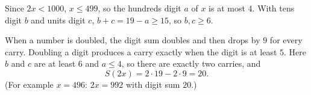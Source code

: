 Since $2x<1000$, $x\le499$, so the hundreds digit $a$ of $x$ is at most $4$. With tens digit $b$ and units digit $c$, $b+c=19-a\ge15$, so $b,c\ge6$.

When a number is doubled, the digit sum doubles and then drops by $9$ for every carry. Doubling a digit produces a carry exactly when the digit is at least $5$. Here $b$ and $c$ are at least $6$ and $a\le4$, so there are exactly two carries, and
\[
S(2x)=2\cdot19-2\cdot9=\boxed{20}.
\]
(For example $x=496$: $2x=992$ with digit sum $20$.)
